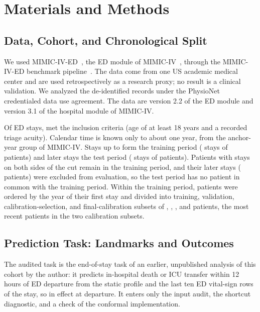 \section{Materials and Methods}
\label{sec:methods}

\subsection{Data, Cohort, and Chronological Split}
\label{sec:methods-cohort}

We used MIMIC-IV-ED~\cite{johnson2023mimicived}, the ED module of MIMIC-IV~\cite{johnson2023mimiciv},
through the MIMIC-IV-ED benchmark pipeline~\cite{xie2022mimic4ed}. The data come from one US academic medical center and are used
retrospectively as a research proxy; no result is a clinical validation. We analyzed the de-identified records under the PhysioNet credentialed data use agreement. The data are version 2.2 of the ED module and version 3.1 of the hospital module of MIMIC-IV.

Of \RVMasterStays{} ED stays, \RVEligibleStays{} met the inclusion criteria (age of at least 18 years and a recorded triage acuity).
Calendar time is known only to about one year, from the anchor-year group of MIMIC-IV. Stays up to \RVCutYear{} form the training period (\RVTrainStays{} stays of \RVTrainPatients{} patients) and
later stays the test period (\RVTestStays{} stays of \RVTestPatients{} patients). Patients with stays on both sides of the cut remain in the
training period, and their \RVExcludedStays{} later stays (\RVExcludedPatients{} patients) were excluded from evaluation, so the test period has
no patient in common with the training period. Within the training period, patients were ordered by the year of their first stay and
divided into training, validation, calibration-selection, and final-calibration subsets of \RVDevTrainPatients{}, \RVDevValPatients{},
\RVDevCsPatients{}, and \RVDevFcPatients{} patients, the most recent patients in the two calibration subsets.

\subsection{Prediction Task: Landmarks and Outcomes}
\label{sec:methods-task}

The audited task is the end-of-stay task of an earlier, unpublished analysis of this cohort by the author: it predicts in-hospital death or ICU transfer within 12 hours of ED departure from the static profile and the last ten ED vital-sign rows of the stay, so in effect at departure. It enters only the input audit, the shortcut diagnostic, and a check of the conformal implementation.

